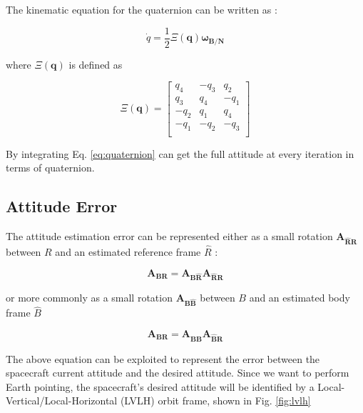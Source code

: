 \documentclass[11pt,a4paper]{report}
\begin{document}
The kinematic equation for the quaternion can be written as :

\begin{equation}
 \label{eq:quaternion}
 \dot{q} = \frac{1}{2} \mathbf{\varXi(\mathbf{q})} \mathbf{\omega_{B/N}}
\end{equation}

where $\mathbf{\varXi(\mathbf{q})}$ is defined as 

\begin{equation*}
 \mathbf{\varXi(\mathbf{q})} =
                                \begin{bmatrix}
                                   q_4 & -q_3 & q_2\\
                                   q_3 & q_4 & -q_1\\
                                  -q_2 & q_1 & q_4\\
                                  -q_1 & -q_2 & -q_3\\
                                \end{bmatrix}
\end{equation*}

By integrating Eq. \ref{eq:quaternion} can get the full attitude at every iteration in terms of quaternion.

\subsection{Attitude Error} \label{sec:lvlh}
The attitude estimation error can be represented either as a small rotation $\mathbf{A_{\hat{R}R}}$ between $R$ and an estimated reference frame $\hat{R}$ :

\begin{equation*}
 \mathbf{A_{BR}} = \mathbf{A_{B \hat{R}}} \mathbf{A_{\hat{R}R}}
\end{equation*}

or more commonly as a small rotation $\mathbf{A_{B \hat{B}}}$ between $B$ and an estimated body frame $\hat{B}$

\begin{equation*}
 \mathbf{A_{BR}} = \mathbf{A_{\hat{B}B}} \mathbf{A_{\hat{B}R}}
\end{equation*}

The above equation can be exploited to represent the error between the spacecraft current attitude and the desired attitude.
Since we want to perform Earth pointing, the spacecraft's desired attitude will be identified by a Local-Vertical/Local-Horizontal (LVLH) orbit frame, shown in Fig. \ref{fig:lvlh}
\end{document}
